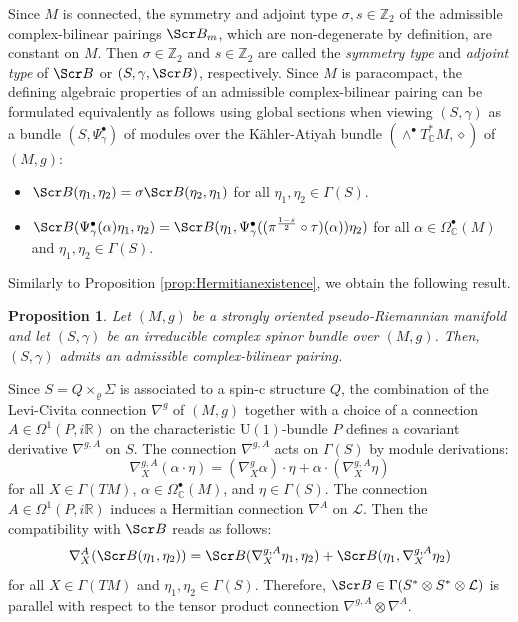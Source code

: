 \documentclass[10pt,a4paper,twoside,reqno]{amsart}
\theoremstyle{plain}
\newtheorem{prop}[thm]{Proposition}
\theoremstyle{definition}
\theoremstyle{remark}
\def\Z{\mathbb{Z}}
\def\C{\mathbb{C}}
\def\R{\mathbb{R}}
\def\scB{\Scr B}
\def\U{\mathrm{U}}
\def\R{\mathbb{R}}
\def\cL{\mathcal{L}}
\begin{document}
Since $M$ is connected, the symmetry and adjoint type $\sigma,s\in\Z_2$ of the admissible complex-bilinear pairings $\scB_m$, which are non-degenerate by definition, are constant on $M$. Then $\sigma\in\Z_2$ and $s\in\Z_2$ are called the \emph{symmetry type} and \emph{adjoint type} of $\scB$ or $(S,\gamma,\scB)$, respectively. Since $M$ is paracompact, the defining algebraic properties of an admissible complex-bilinear pairing can be formulated equivalently as follows using global sections when viewing $(S,\gamma)$ as a bundle $(S,\Psi^{\bullet}_\gamma)$ of modules over the Kähler-Atiyah bundle $(\wedge^{\bullet}T^*_\C M,\diamond)$ of $(M,g)$: 
\begin{itemize}
\item $\scB(\eta_1,\eta_2)=\sigma\scB(\eta_2,\eta_1)$ for all $\eta_1,\eta_2\in\Gamma(S)$.
\item $\scB(\Psi^{\bullet}_\gamma(\alpha)\eta_1,\eta_2)=\scB(\eta_1,\Psi^{\bullet}_\gamma((\pi^{\frac{1-s}{2}}\circ\tau)(\alpha))\eta_2)$ for all $\alpha\in\Omega^{\bullet}_\C(M)$ and $\eta_1,\eta_2\in\Gamma(S)$.
\end{itemize} 

Similarly to Proposition \ref{prop:Hermitianexistence}, we obtain the following result.

\begin{prop}
\label{prop:ComplexBilinealexistence}
Let $(M,g)$ be a strongly oriented pseudo-Riemannian manifold and let $(S,\gamma)$ be an irreducible complex spinor bundle over $(M,g)$. Then, $(S,\gamma)$ admits an admissible complex-bilinear pairing.
\end{prop}

Since $S = Q\times_{\varrho} \Sigma$ is associated to a spin-c structure $Q$, the combination of the Levi-Civita connection $\nabla^g$ of $(M,g)$ together with a choice of a connection $A\in\Omega^1(P,i\R)$ on the characteristic $\U(1)$-bundle $P$ defines a covariant derivative $\nabla^{g,A}$ on $S$. The connection $\nabla^{g,A}$ acts on $\Gamma(S)$ by module derivations: 
\begin{equation*}
\nabla^{g,A}_X(\alpha\cdot\eta)=(\nabla^g_X\alpha)\cdot\eta+\alpha\cdot(\nabla^{g,A}_X\eta)    
\end{equation*}
for all $X\in\Gamma(TM)$, $\alpha\in\Omega^{\bullet}_\C(M)$, and $\eta\in\Gamma(S)$. The connection $A\in\Omega^1(P,i\R)$ induces a Hermitian connection $\nabla^{A}$ on $\cL$. Then the compatibility with $\scB$ reads as follows: $$\nabla^{A}_X(\scB(\eta_1,\eta_2))=\scB(\nabla^{g,A}_X\eta_1,\eta_2)+\scB(\eta_1,\nabla^{g,A}_X\eta_2)$$ for all $X\in\Gamma(TM)$ and $\eta_1,\eta_2\in\Gamma(S)$. Therefore, $\scB\in\Gamma(S^*\otimes S^*\otimes\cL)$ is parallel with respect to the tensor product connection $\nabla^{g,A}\otimes\nabla^{A}$.\medskip
\end{document}
